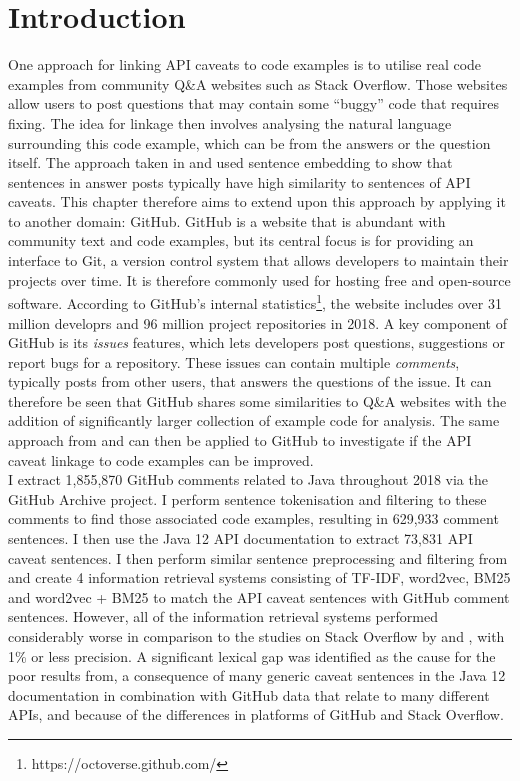 \section{Introduction}
\label{sec:info-intro}
One approach for linking API caveats to code examples is to utilise real code examples from community Q\&A websites such as Stack Overflow. Those websites allow users to post questions that may contain some ``buggy'' code that requires fixing. The idea for linkage then involves analysing the natural language surrounding this code example, which can be from the answers or the question itself. The approach taken in \cite{jiamou} and \cite{xiaoxue} used sentence embedding to show that sentences in answer posts typically have high similarity to sentences of API caveats. This chapter therefore aims to extend upon this approach by applying it to another domain: GitHub. GitHub is a website that is abundant with community text and code examples, but its central focus is for providing an interface to Git, a version control system that allows developers to maintain their projects over time. It is therefore commonly used for hosting free and open-source software. According to GitHub's internal statistics\footnote{https://octoverse.github.com/}, the website includes over 31 million developrs and 96 million project repositories in 2018. A key component of GitHub is its \textit{issues} features, which lets developers post questions, suggestions or report bugs for a repository. These issues can contain multiple \textit{comments}, typically posts from other users, that answers the questions of the issue. It can therefore be seen that GitHub shares some similarities to Q\&A websites with the addition of significantly larger collection of example code for analysis. The same approach from \cite{jiamou} and \cite{xiaoxue} can then be applied to GitHub to investigate if the API caveat linkage to code examples can be improved. \\
I extract 1,855,870 GitHub comments related to Java throughout 2018 via the GitHub Archive project. I perform sentence tokenisation and filtering to these comments to find those associated code examples, resulting in 629,933 comment sentences. I then use the Java 12 API documentation to extract 73,831 API caveat sentences. I then perform similar sentence preprocessing and filtering from \cite{jiamou} and create 4 information retrieval systems consisting of TF-IDF, word2vec, BM25 and word2vec + BM25 to match the API caveat sentences with GitHub comment sentences. However, all of the information retrieval systems performed considerably worse in comparison to the studies on Stack Overflow by \cite{jiamou} and \cite{xiaoxue}, with 1\% or less precision. A significant lexical gap was identified as the cause for the poor results from, a consequence of many generic caveat sentences in the Java 12 documentation in combination with GitHub data that relate to many different APIs, and because of the differences in platforms of GitHub and Stack Overflow.

